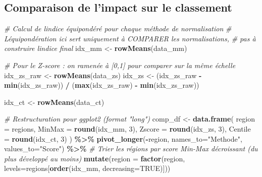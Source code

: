 \documentclass[
]{article}
\newenvironment{Shaded}{\begin{snugshade}}{\end{snugshade}}
\newcommand{\AttributeTok}[1]{\textcolor[rgb]{0.13,0.29,0.53}{#1}}
\newcommand{\CommentTok}[1]{\textcolor[rgb]{0.56,0.35,0.01}{\textit{#1}}}
\newcommand{\ConstantTok}[1]{\textcolor[rgb]{0.56,0.35,0.01}{#1}}
\newcommand{\DecValTok}[1]{\textcolor[rgb]{0.00,0.00,0.81}{#1}}
\newcommand{\FunctionTok}[1]{\textcolor[rgb]{0.13,0.29,0.53}{\textbf{#1}}}
\newcommand{\NormalTok}[1]{#1}
\newcommand{\OtherTok}[1]{\textcolor[rgb]{0.56,0.35,0.01}{#1}}
\newcommand{\SpecialCharTok}[1]{\textcolor[rgb]{0.81,0.36,0.00}{\textbf{#1}}}
\newcommand{\StringTok}[1]{\textcolor[rgb]{0.31,0.60,0.02}{#1}}
\begin{document}
\subsection{Comparaison de l'impact sur le
classement}\label{comparaison-de-limpact-sur-le-classement}

\begin{Shaded}
\begin{Highlighting}[]
\CommentTok{\# Calcul de l\textquotesingle{}indice équipondéré pour chaque méthode de normalisation}
\CommentTok{\# L\textquotesingle{}équipondération ici sert uniquement à COMPARER les normalisations,}
\CommentTok{\# pas à construire l\textquotesingle{}indice final}
\NormalTok{idx\_mm }\OtherTok{\textless{}{-}} \FunctionTok{rowMeans}\NormalTok{(data\_mm)}

\CommentTok{\# Pour le Z{-}score : on ramenée à [0,1] pour comparer sur la même échelle}
\NormalTok{idx\_zs\_raw }\OtherTok{\textless{}{-}} \FunctionTok{rowMeans}\NormalTok{(data\_zs)}
\NormalTok{idx\_zs }\OtherTok{\textless{}{-}}\NormalTok{ (idx\_zs\_raw }\SpecialCharTok{{-}} \FunctionTok{min}\NormalTok{(idx\_zs\_raw)) }\SpecialCharTok{/}\NormalTok{ (}\FunctionTok{max}\NormalTok{(idx\_zs\_raw) }\SpecialCharTok{{-}} \FunctionTok{min}\NormalTok{(idx\_zs\_raw))}

\NormalTok{idx\_ct }\OtherTok{\textless{}{-}} \FunctionTok{rowMeans}\NormalTok{(data\_ct)}

\CommentTok{\# Restructuration pour ggplot2 (format "long")}
\NormalTok{comp\_df }\OtherTok{\textless{}{-}} \FunctionTok{data.frame}\NormalTok{(}
  \AttributeTok{region  =}\NormalTok{ regions,}
  \AttributeTok{MinMax  =} \FunctionTok{round}\NormalTok{(idx\_mm, }\DecValTok{3}\NormalTok{),}
  \AttributeTok{Zscore  =} \FunctionTok{round}\NormalTok{(idx\_zs, }\DecValTok{3}\NormalTok{),}
  \AttributeTok{Centile =} \FunctionTok{round}\NormalTok{(idx\_ct, }\DecValTok{3}\NormalTok{)}
\NormalTok{) }\SpecialCharTok{\%\textgreater{}\%}
  \FunctionTok{pivot\_longer}\NormalTok{(}\SpecialCharTok{{-}}\NormalTok{region, }\AttributeTok{names\_to=}\StringTok{"Methode"}\NormalTok{, }\AttributeTok{values\_to=}\StringTok{"Score"}\NormalTok{) }\SpecialCharTok{\%\textgreater{}\%}
  \CommentTok{\# Trier les régions par score Min{-}Max décroissant (du plus développé au moins)}
  \FunctionTok{mutate}\NormalTok{(}\AttributeTok{region =} \FunctionTok{factor}\NormalTok{(region, }\AttributeTok{levels=}\NormalTok{regions[}\FunctionTok{order}\NormalTok{(idx\_mm, }\AttributeTok{decreasing=}\ConstantTok{TRUE}\NormalTok{)]))}


\end{Highlighting}
\end{Shaded}
\end{document}
